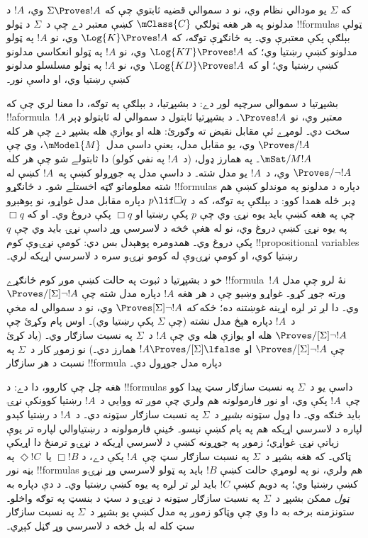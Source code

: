 \documentclass[../../../include/open-logic-section]{subfiles}
\begin{document}


که $\Sigma$ يو مودالي نظام وي، نو د سموالي قضيه ثابتوي چې که
$\Sigma \Proves !A$ وي، $!A$ د مدلونو په هر هغه ټولګي
$\mClass{C}$ کښې معتبر دے چې د~$\Sigma$ د ټولو !!{formula}s
ټولې بېلګې پکې معتبرې وي۔ په ځانګړې توګه، که $\Log{K}
\Proves !A$ وي، نو $!A$ په ټولو مدلونو کښې رښتيا وي؛ که
$\Log{KT} \Proves !A$ وي، نو $!A$ په ټولو انعکاسي مدلونو کښې
رښتيا وي؛ او که $\Log{KD} \Proves !A$ وي، نو $!A$ په ټولو
مسلسلو مدلونو کښې رښتيا وي، او داسې نور۔

بشپړتيا د سموالي سرچپه لور دے: د  بشپړتيا، د بېلګې په
توګه، دا معنا لري چې که !!a{formula}~$!A$ معتبر وي، نو
$\Proves !A$۔ د بشپړتيا ثابتول د سموالي له ثابتولو ډېر سخت دي۔
لومړے ئې مقابل نقيض ته وګورئ:  هله او يوازې هله بشپړ
دے چې هر کله $\Proves/ !A$ وي، يو مقابل مدل، يعنې داسې
مدل~$\mModel{M}$، وي چې $\mSat/{M}{!A}$۔ په همارز ډول،
(د~$!A$ په نفي کولو) دا ثابتولے شو چې هر کله
$\Proves/ \lnot !A$ وي، د~$!A$ يو مدل شته۔ د داسې مدل په جوړولو
کښې په~$!A$ کښې له شته معلوماتو ګټه اخستلے شو۔ د ځانګړو
!!{formula}s دپاره د مدلونو په موندلو کښې هم ډېر ځله همدا کوو:
د بېلګې په توګه، که د $p \lif \Box q$ دپاره مقابل مدل غواړو،
نو پوهېږو چې په هغه کښې بايد يوه نړۍ وي چې $p$ پکې رښتيا او
$\Box q$ پکې دروغ وي۔ او که $\Box q$ په يوه نړۍ کښې دروغ وي،
نو له هغې څخه د لاسرسي وړ داسې نړۍ بايد وي چې $q$ پکې دروغ
وي۔ همدومره پوهېدل بس دي: کومې نړۍوې کوم !!{propositional variable}s
رښتيا کوي، او کومې نړۍوې له کومو نړۍو سره د لاسرسي اړيکه لري۔

خو د بشپړتيا د ثبوت په حالت کښې موږ کوم ځانګړے !!{formula}~$!A$
نۀ لرو چې مدل ورته جوړ کړو۔ غواړو وښيو چې د هر هغه $!A$ دپاره
مدل شته چې $\Proves/[\Sigma] \lnot !A$ وي۔ دا لږ تر لږه اړينه
غوښتنه ده؛ ځکه \emph{که} $\Proves[\Sigma] \lnot !A$ وي، نو د
سموالي له مخې د~$!A$ دپاره هېڅ مدل نشته (چې $\Sigma$ پکې
رښتيا وي)۔ اوس پام وکړئ چې $\Proves/[\Sigma] \lnot !A$ هله او
يوازې هله وي چې $!A$ د~$\Sigma$ په نسبت سازګار وي۔ (ياد کړئ
چې $\Proves/[\Sigma] \lnot !A$ او
$!A \Proves/[\Sigma] \lfalse$ همارز دي۔) نو زموږ کار د~$\Sigma$
په نسبت د هر سازګار !!{formula} دپاره مدل جوړول دي۔

هغه چل چې کاروو، دا دے: د !!{formula}s داسې يو د~$\Sigma$ په نسبت
سازګار سټ پيدا کوو چې~$!A$ پکې وي، او نور فارمولونه هم ولري چې
موږ ته ووايي د~$!A$ رښتيا کوونکې نړۍ بايد څنګه وي۔ دا ډول سټونه
\emph{بشپړ} د~$\Sigma$ په نسبت سازګار سټونه دي۔ د~$!A$ د رښتيا کېدو لپاره د لاسرسي اړيکه هم
په پام کښې نيسو۔ ځينې فارمولونه د رښتياوالي لپاره تر يوې زياتې
نړۍ غواړي؛ زموږ په جوړونه کښې د لاسرسي اړيکه د نړۍو ترمنځ دا
اړيکې ټاکي۔ که هغه بشپړ د~$\Sigma$ په نسبت سازګار سټ چې~$!A$
پکې دے، د $\Box !B$ يا~$\Diamond !C$ په بڼه نور !!{formula}s
هم ولري، نو په لومړي حالت کښې $!B$ بايد په ټولو لاسرسي وړ نړۍو
کښې رښتيا وي؛ په دويم کښې $!C$ بايد لږ تر لږه په يوه کښې رښتيا وي۔ د دې دپاره به
\emph{ټول} ممکن بشپړ د~$\Sigma$ په نسبت سازګار سټونه د نړۍو د سټ
د بنسټ په توګه واخلو۔ ستونزمنه برخه به دا وي چې وټاکو زموږ په
مدل کښې يو بشپړ د~$\Sigma$ په نسبت سازګار سټ کله له بل څخه د
لاسرسي وړ ګڼل کېږي۔
\end{document}
